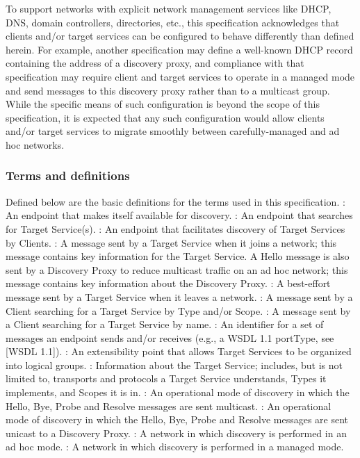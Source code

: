 \documentclass{note}
\begin{document}
To support networks with explicit network management services like DHCP, DNS,
domain controllers, directories, etc., this specification acknowledges that
clients and/or target services can be configured to behave differently than
defined herein. For example, another specification may define a well-known
DHCP record containing the address of a discovery proxy, and compliance with
that specification may require client and target services to operate in a
managed mode and send messages to this discovery proxy rather than to a
multicast group. While the specific means of such configuration is beyond the
scope of this specification, it is expected that any such configuration would
allow clients and/or target services to migrate smoothly between
carefully-managed and ad hoc networks. 

\subsubsection{Terms and definitions}
Defined below are the basic definitions for the terms used in this
specification. 
\bit
\w {}:
An endpoint that makes itself available for discovery.
\w {}:
An endpoint that searches for Target Service(s).
\w {}:
An endpoint that facilitates discovery of Target Services by Clients.
\w {}:
A message sent by a Target Service when it joins a network; this message
contains key information for the Target Service. A Hello message is also sent
by a Discovery Proxy to reduce multicast traffic on an ad hoc network; this
message contains key information about the Discovery Proxy. 
\w {}:
A best-effort message sent by a Target Service when it leaves a network.
\w {}:
A message sent by a Client searching for a Target Service by Type and/or Scope.
\w {}:
A message sent by a Client searching for a Target Service by name.
\w {}:
An identifier for a set of messages an endpoint sends and/or receives (e.g., a WSDL 1.1 portType, see [WSDL 1.1]).
\w {}:
An extensibility point that allows Target Services to be organized into logical groups.
\w {}:
Information about the Target Service; includes, but is not limited to,
transports and protocols a Target Service understands, Types it implements,
and Scopes it is in. 
\w {}:
An operational mode of discovery in which the Hello, Bye, Probe and Resolve
messages are sent multicast. 
\w {}:
An operational mode of discovery in which the Hello, Bye, Probe and Resolve
messages are sent unicast to a Discovery Proxy. 
\w {}:
A network in which discovery is performed in an ad hoc mode.
\w {}:
A network in which discovery is performed in a managed mode.
\eit
\end{document}
